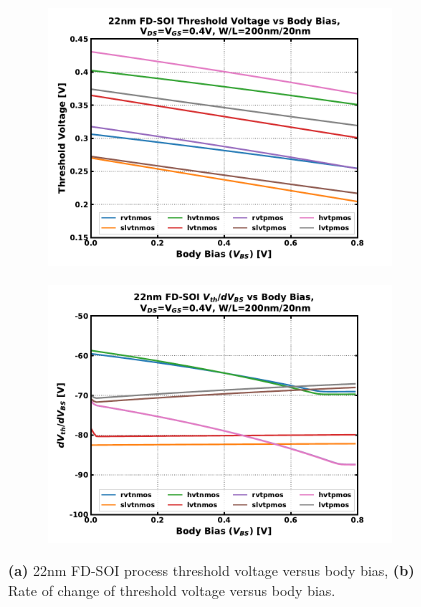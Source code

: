 		\begin{figure}[htb!]
		    \centering
		    \begin{subfigure}{0.5\textwidth}
		        \centering
		        \includegraphics[width=1\textwidth, angle=0]{./figs/design/vth_vbs}
		        \caption{ }
		        \label{fig:vth_vs_vbs}
		    \end{subfigure}%
		    \begin{subfigure}{0.5\textwidth}
		        \centering
		        \includegraphics[width=1\textwidth, angle=0]{./figs/design/vth_slope_vbs}
		        \caption{ }
		        \label{fig:vth_slope_vs_vbs}
		    \end{subfigure}
		    \caption{\textbf{(a)} 22nm FD-SOI process threshold voltage versus body bias, \textbf{(b)} Rate of change of threshold voltage versus body bias.}
		    \label{fig:vth_groupa}
		\end{figure} 


